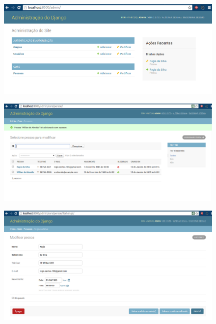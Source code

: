 \documentclass{beamer}
\begin{document}
{\begin{frame}
\end{frame}



\begin{frame}

    \begin{figure}[h]
      \centering
        \includegraphics[width=\paperwidth]{img/admin2.png}
    \end{figure}

\end{frame}



\begin{frame}

    \begin{figure}[h]
      \centering
        \includegraphics[width=.9\paperwidth]{img/admin3.png}
    \end{figure}

\end{frame}



\begin{frame}

    \begin{figure}[h]
      \centering
        \includegraphics[width=.9\paperwidth]{img/admin4.png}
    \end{figure}


\end{frame}}
\end{document}
